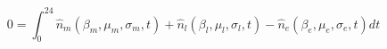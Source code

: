 \begin{equation}
0 = \int_{0}^{24}\hat{n}_m(\beta_m,\mu_m,\sigma_m,t) + \hat{n}_l(\beta_l,\mu_l,\sigma_l,t) - \hat{n}_e(\beta_e,\mu_e,\sigma_e,t) dt
\label{ch4:equ:normal-distribution-balance}
\end{equation}
